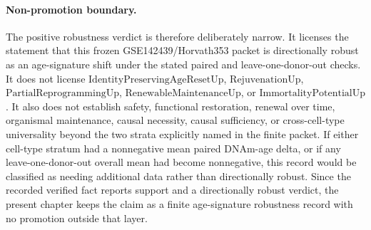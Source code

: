 \paragraph{Non-promotion boundary.}
The positive robustness verdict is therefore deliberately narrow.  It licenses the statement that this frozen GSE142439/Horvath353 packet is directionally robust as an age-signature shift under the stated paired and leave-one-donor-out checks.  It does not license $\mathrm{IdentityPreservingAgeResetUp}$, $\mathrm{RejuvenationUp}$, $\mathrm{PartialReprogrammingUp}$, $\mathrm{RenewableMaintenanceUp}$, or $\mathrm{ImmortalityPotentialUp}$.  It also does not establish safety, functional restoration, renewal over time, organismal maintenance, causal necessity, causal sufficiency, or cross-cell-type universality beyond the two strata explicitly named in the finite packet.  If either cell-type stratum had a nonnegative mean paired DNAm-age delta, or if any leave-one-donor-out overall mean had become nonnegative, this record would be classified as needing additional data rather than directionally robust.  Since the recorded verified fact reports support and a directionally robust verdict, the present chapter keeps the claim as a finite age-signature robustness record with no promotion outside that layer.
